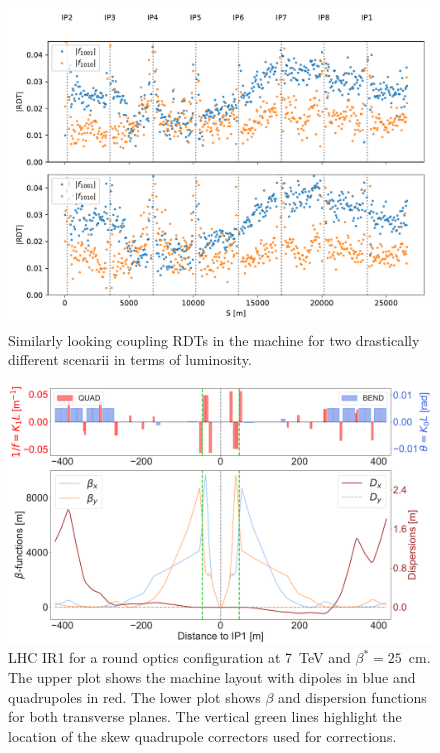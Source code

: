 \begin{figure}
    \centering
    \includegraphics*[width=0.9\linewidth]{Figures/Chapter4/guess_rdts.pdf}
    \caption{Similarly looking coupling RDTs in the machine for two drastically different scenarii in terms of luminosity.}
    \label{figure:guess_rdts}
\end{figure}

\begin{figure}[!htb]
    \centering
    \includegraphics*[width=0.99\columnwidth]{Figures/Chapter4/round_lhcb1_ir1.pdf}
    \caption{LHC IR1 for a round optics configuration at 7~TeV and $\beta^{*} = 25$~cm. The upper plot shows the machine layout with dipoles in blue and quadrupoles in red. The lower plot shows $\beta$ and dispersion functions for both transverse planes. The vertical green lines highlight the location of the skew quadrupole correctors used for corrections.}
    \label{fig:lhcb1_round_optics_ir1}
\end{figure}

